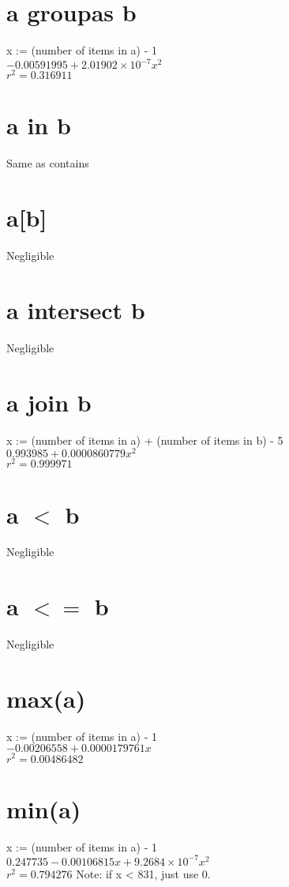 \documentclass[12pt]{article}
\begin{document}
	\section{a groupas b}
	x := (number of items in a) - 1\\
	$-0.00591995 + 2.01902 \times 10^{-7} x^2$\\
	$r^2 = 0.316911$
	
	\section{a in b}
	Same as contains
	
	\section{a[b]}
	Negligible
	
	\section{a intersect b}
	Negligible
	
	\section{a join b}
	x := (number of items in a) + (number of items in b) - 5\\
	$0.993985 + 0.0000860779 x^2$\\
	$r^2 = 0.999971$
	
	\section{a $<$ b}
	Negligible
	
	\section{a $<=$ b}
	Negligible
	
	\section{max(a)}
	x := (number of items in a) - 1\\
	$-0.00206558 + 0.0000179761 x$\\
	$r^2 = 0.00486482$
	
	\section{min(a)}
	x := (number of items in a) - 1\\
	$0.247735 - 0.00106815 x + 9.2684 \times 10^{-7} x^2$\\
	$r^2 = 0.794276$
	Note: if x < 831, just use 0.
	
\end{document}
